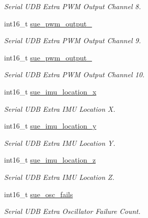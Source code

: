 \begin{DoxyCompactItemize}
\begin{DoxyCompactList}\small\item\em Serial U\+D\+B Extra P\+W\+M Output Channel 8. \end{DoxyCompactList}\item 
int16\+\_\+t \hyperlink{struct____mavlink__serial__udb__extra__f2__b__t_a2e0e6d2f306d53eed95313fa58c7bf33}{sue\+\_\+pwm\+\_\+output\+\_}
\begin{DoxyCompactList}\small\item\em Serial U\+D\+B Extra P\+W\+M Output Channel 9. \end{DoxyCompactList}\item 
int16\+\_\+t \hyperlink{struct____mavlink__serial__udb__extra__f2__b__t_ad8afeea43fd26ec6ae5314535e281fa6}{sue\+\_\+pwm\+\_\+output\+\_}
\begin{DoxyCompactList}\small\item\em Serial U\+D\+B Extra P\+W\+M Output Channel 10. \end{DoxyCompactList}\item 
int16\+\_\+t \hyperlink{struct____mavlink__serial__udb__extra__f2__b__t_a4bdfc71dba31aabf68775f33118f8771}{sue\+\_\+imu\+\_\+location\+\_\+x}
\begin{DoxyCompactList}\small\item\em Serial U\+D\+B Extra I\+M\+U Location X. \end{DoxyCompactList}\item 
int16\+\_\+t \hyperlink{struct____mavlink__serial__udb__extra__f2__b__t_aef43137465cbbb765b10b6c269fe0fc1}{sue\+\_\+imu\+\_\+location\+\_\+y}
\begin{DoxyCompactList}\small\item\em Serial U\+D\+B Extra I\+M\+U Location Y. \end{DoxyCompactList}\item 
int16\+\_\+t \hyperlink{struct____mavlink__serial__udb__extra__f2__b__t_a79e9a470992c332d7fab523a3d7538b4}{sue\+\_\+imu\+\_\+location\+\_\+z}
\begin{DoxyCompactList}\small\item\em Serial U\+D\+B Extra I\+M\+U Location Z. \end{DoxyCompactList}\item 
int16\+\_\+t \hyperlink{struct____mavlink__serial__udb__extra__f2__b__t_a77c355757a2ec46263c076b38cfdf8e9}{sue\+\_\+osc\+\_\+fails}
\begin{DoxyCompactList}\small\item\em Serial U\+D\+B Extra Oscillator Failure Count. \end{DoxyCompactList}\item 

\end{DoxyCompactItemize}
